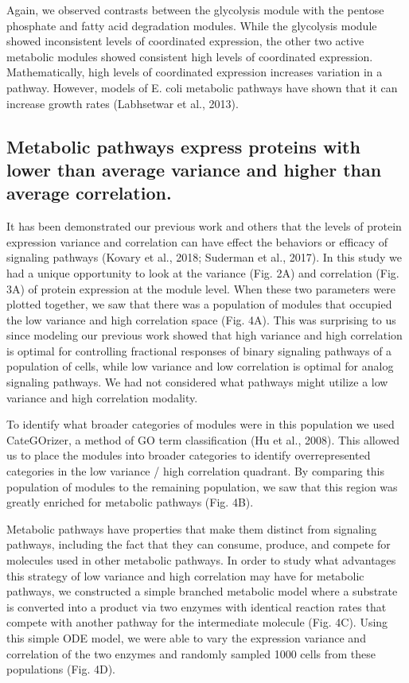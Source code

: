 Again, we observed contrasts between the glycolysis module with the pentose phosphate and fatty acid degradation modules. While the glycolysis module showed inconsistent levels of coordinated expression, the other two active metabolic modules showed consistent high levels of coordinated expression. Mathematically, high levels of coordinated expression increases variation in a pathway. However, models of E. coli metabolic pathways have shown that it can increase growth rates (Labhsetwar et al., 2013). 

\subsection{Metabolic pathways express proteins with lower than average variance and higher than average correlation.}

It has been demonstrated our previous work and others that the levels of protein expression variance and correlation can have effect the behaviors or efficacy of signaling pathways (Kovary et al., 2018; Suderman et al., 2017). In this study we had a unique opportunity to look at the variance (Fig. 2A) and correlation (Fig. 3A) of protein expression at the module level. When these two parameters were plotted together, we saw that there was a population of modules that occupied the low variance and high correlation space (Fig. 4A). This was surprising to us since modeling our previous work showed that high variance and high correlation is optimal for controlling fractional responses of binary signaling pathways of a population of cells, while low variance and low correlation is optimal for analog signaling pathways. We had not considered what pathways might utilize a low variance and high correlation modality.

To identify what broader categories of modules were in this population we used CateGOrizer, a method of GO term classification (Hu et al., 2008). This allowed us to place the modules into broader categories to identify overrepresented categories in the low variance / high correlation quadrant. By comparing this population of modules to the remaining population, we saw that this region was greatly enriched for metabolic pathways (Fig. 4B). 

Metabolic pathways have properties that make them distinct from signaling pathways, including the fact that they can consume, produce, and compete for molecules used in other metabolic pathways. In order to study what advantages this strategy of low variance and high correlation may have for metabolic pathways, we constructed a simple branched metabolic model where a substrate is converted into a product via two enzymes with identical reaction rates that compete with another pathway for the intermediate molecule (Fig. 4C). Using this simple ODE model, we were able to vary the expression variance and correlation of the two enzymes and randomly sampled 1000 cells from these populations (Fig. 4D).

